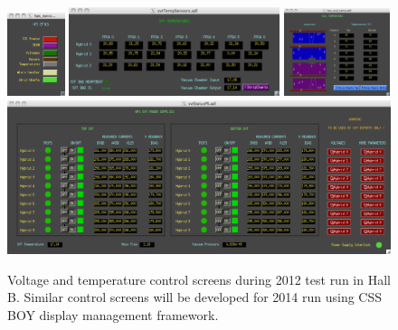 \begin{figure}[t]
\begin{center}
\includegraphics[width=0.15\textwidth]{slow_control/hps_epics}
\includegraphics[width=0.55\textwidth]{slow_control/SVT_temp_monitor}
\includegraphics[width=0.275\textwidth]{slow_control/ECal_temp_monitor}
\includegraphics[width=\textwidth]{slow_control/SVT_HV_control_monitor}
\caption{Voltage and temperature control screens during 2012 test run in Hall B. Similar control screens will be developed for 
2014 run using CSS BOY display management framework.}
\label{fig:svt_power}
\end{center}
\end{figure}

